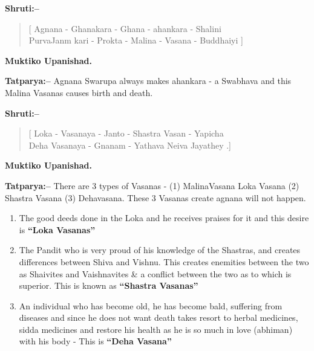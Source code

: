 \newpage

\textbf{Shruti:–}

\begin{verse}
[ Agnana - Ghanakara - Ghana - ahankara - Shalini \\ PurvaJanm kari - Prokta - Malina - Vasana - Buddhaiyi ]
\end{verse}

\begin{flushright}
\textbf{Muktiko Upanishad.}
\end{flushright}

\textbf{Tatparya:–} Agnana Swarupa always makes ahankara - a Swabhava and this Malina Vasanas causes birth and death.

\textbf{Shruti:–}

\begin{verse}
[ Loka - Vasanaya - Janto - Shastra Vasan - Yapicha \\ Deha Vasanaya - Gnanam - Yathava  Neiva Jayathey .]
\end{verse}

\begin{flushright}
\textbf{Muktiko Upanishad.}
\end{flushright}

\textbf{Tatparya:–} There are 3 types of Vasanas - (1) MalinaVasana Loka Vasana (2) Shastra Vasana (3) Dehavasana. These 3 Vasanas create agnana will not happen.

\begin{enumerate}
\item The good deeds done in the Loka and he receives praises for it and this desire is \textbf{“Loka Vasanas”}

 \item The Pandit who is very proud of his knowledge of the Shastras, and creates differences between Shiva and Vishnu. This creates enemities between the two as Shaivites and Vaishnavites \& a conflict between the two as to which is superior. This is known as \textbf{“Shastra Vasanas”}

 \item An individual who has become old, he has become bald, suffering from diseases and since he does not want death takes resort to herbal medicines, sidda medicines and restore his health as he is so much in love (abhiman) with his body - This is \textbf{“Deha Vasana”}

\end{enumerate}

